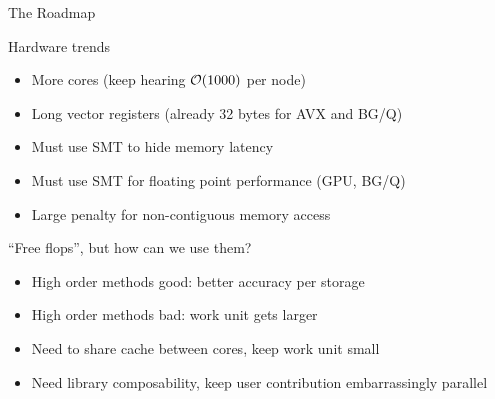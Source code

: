 \begin{frame}{The Roadmap}
  \begin{block}{Hardware trends}
    \begin{itemize}
    \item More cores (keep hearing $\mathcal{O}(1000)$ per node)
    \item Long vector registers (already 32 bytes for AVX and BG/Q)
    \item Must use SMT to hide memory latency
    \item Must use SMT for floating point performance (GPU, BG/Q)
    \item Large penalty for non-contiguous memory access
    \end{itemize}
  \end{block}
  \begin{block}{``Free flops'', but how can we use them?}
    \begin{itemize}
    \item High order methods good: better accuracy per storage
    \item High order methods bad: work unit gets larger
    \item Need to share cache between cores, keep work unit small
    \item Need library composability, keep user contribution embarrassingly parallel
    \end{itemize}
  \end{block}
\end{frame}
